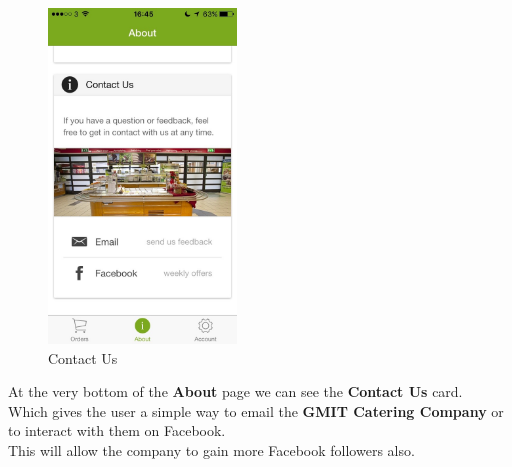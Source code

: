 \begin{minipage}{5cm}
	\begin{figure}[H]
		\includegraphics[width=5cm]{img/mobile-app/screen-shots/IMG_2913.jpg}
		\caption{Contact Us}
	\end{figure}
\end{minipage} \hfill
\begin{minipage}{0.55\textwidth}
At the very bottom of the \textbf{About} page we can see the \textbf{Contact Us} card.
\\

Which gives the user a simple way to email the \textbf{GMIT Catering Company} or to interact with them on Facebook.
\\

This will allow the company to gain more Facebook followers also.
\end{minipage}

